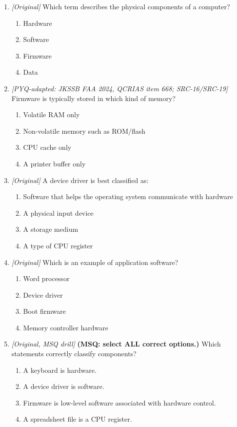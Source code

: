 \begin{enumerate}[label=\textbf{Q\arabic*.}, leftmargin=*]
\begin{enumerate}[label=\Alph*.]
    \item A device driver is a hardware component.
  \end{enumerate}
\item \textit{[Original]} Which term describes the physical components of a computer?
  \begin{enumerate}[label=\Alph*.]
\item Hardware
   \item Software
   \item Firmware
   \item Data
  \end{enumerate}

\item \textit{[PYQ-adapted: JKSSB FAA 2024, QCRIAS item 668; SRC-16/SRC-19]} Firmware is typically stored in which kind of memory?
  \begin{enumerate}[label=\Alph*.]
\item Volatile RAM only
   \item Non-volatile memory such as ROM/flash
   \item CPU cache only
   \item A printer buffer only
  \end{enumerate}

\item \textit{[Original]} A device driver is best classified as:
  \begin{enumerate}[label=\Alph*.]
\item Software that helps the operating system communicate with hardware
   \item A physical input device
   \item A storage medium
   \item A type of CPU register
  \end{enumerate}

\item \textit{[Original]} Which is an example of application software?
  \begin{enumerate}[label=\Alph*.]
\item Word processor
   \item Device driver
   \item Boot firmware
   \item Memory controller hardware
  \end{enumerate}

\item \textit{[Original, MSQ drill]} \textbf{(MSQ: select ALL correct options.)} Which statements correctly classify components?
  \begin{enumerate}[label=\Alph*.]
\item A keyboard is hardware.
   \item A device driver is software.
   \item Firmware is low-level software associated with hardware control.
   \item A spreadsheet file is a CPU register.
  \end{enumerate}

\end{enumerate}
